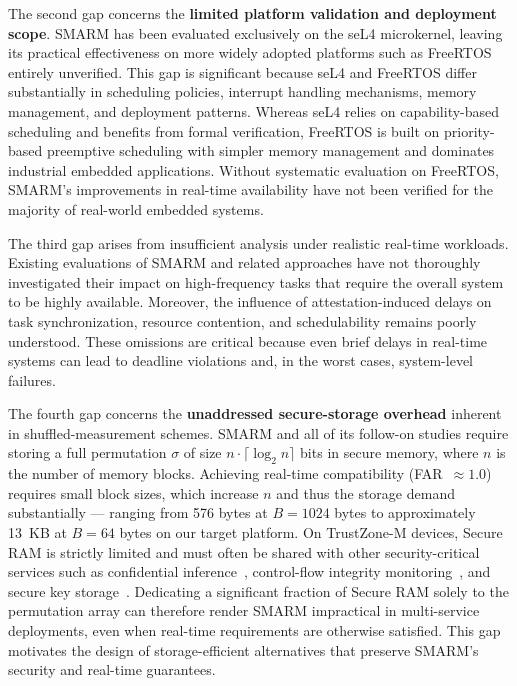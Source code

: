 \documentclass[a4paper,10pt]{article}
\begin{document}
{{The second gap concerns the \textbf{limited platform validation and deployment scope}. SMARM has been evaluated exclusively on the seL4 microkernel, leaving its practical effectiveness on more widely adopted platforms such as FreeRTOS entirely unverified. This gap is significant because seL4 and FreeRTOS differ substantially in scheduling policies, interrupt handling mechanisms, memory management, and deployment patterns. Whereas seL4 relies on capability-based scheduling and benefits from formal verification, FreeRTOS is built on priority-based preemptive scheduling with simpler memory management and dominates industrial embedded applications. Without systematic evaluation on FreeRTOS, SMARM's improvements in real-time availability have not been 
verified for the majority of real-world embedded systems.

The third gap arises from insufficient analysis under realistic real-time workloads. Existing evaluations of SMARM and related approaches have not thoroughly investigated their impact on high-frequency tasks that require the overall system to be highly available. 
Moreover, the influence of attestation-induced delays on task synchronization, resource contention, and schedulability remains poorly understood. These omissions are critical because even brief delays in real-time systems can lead to deadline violations and, in the worst cases, 
system-level failures.

The fourth gap concerns the \textbf{unaddressed secure-storage overhead} 
inherent in shuffled-measurement schemes. SMARM and all of its follow-on studies 
require storing a full permutation $\sigma$ of size $n \cdot \lceil \log_2 n \rceil$ bits 
in secure memory, where $n$ is the number of memory blocks. Achieving real-time 
compatibility (FAR~$\approx 1.0$) requires small block sizes, which increase $n$ and 
thus the storage demand substantially — ranging from 576 bytes at $B = 1024$ bytes 
to approximately 13~KB at $B = 64$ bytes on our target platform. On TrustZone-M 
devices, Secure RAM is strictly limited and must often be shared with other 
security-critical services such as confidential inference~\cite{islam2023confidential}, 
control-flow integrity monitoring~\cite{kawada2021tzmcfi}, and secure key 
storage~\cite{silabs2020an1271}. Dedicating a significant fraction of Secure RAM 
solely to the permutation array can therefore render SMARM impractical in 
multi-service deployments, even when real-time requirements are otherwise satisfied. 
This gap motivates the design of storage-efficient alternatives that preserve 
SMARM's security and real-time guarantees.}

}
\end{document}
